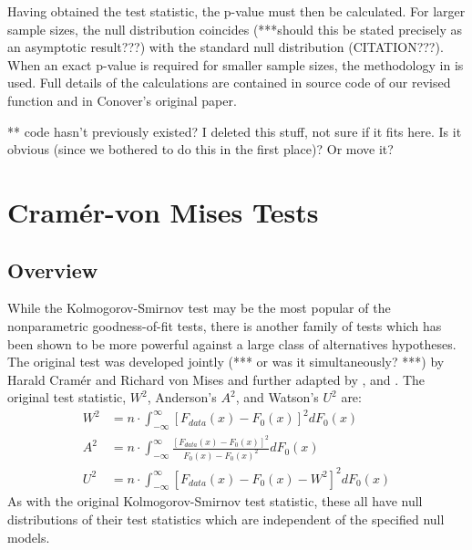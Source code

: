 Having obtained the test statistic, the p-value must then be calculated. 
For larger sample sizes, the null distribution coincides 
(***should this be
stated precisely as an asymptotic result???)
with the standard null distribution (CITATION???). 
When an exact p-value is required for
smaller sample sizes, the methodology in \citet{Conover1972} is used. 
Full details of the calculations are contained in source code
of our revised function  and in Conover's original paper. 

** code hasn't previously existed?  I deleted this stuff, not sure if
it fits here.  Is it obvious (since we bothered to do this in the first
place)?  Or move it?



\section{Cram\'{e}r-von Mises Tests}

\subsection{Overview}


While the Kolmogorov-Smirnov test may be the most popular of
the nonparametric goodness-of-fit tests, there is another family of 
tests which has been shown to be more powerful against a large class
of alternatives hypotheses. 
The original test was developed jointly (*** or was it simultaneously? ***) by
Harald Cram\'{e}r and Richard von Mises \citep{cramer1928, vonmises1928} and further adapted by \cite{anderson1952}, and  \cite{Watson1961}. 
The original test statistic, $W^2$, Anderson's $A^2$, and Watson's
$U^2$ are:
\begin{align}
W^2 &= n \cdot \int_{-\infty}^{\infty} \left[ F_{data}(x)- F_{0}(x) \right]^2 dF_0(x) \\
A^2 &= n \cdot \int_{-\infty}^{\infty} \frac{\left[F_{data}(x)- F_{0}(x) \right]^2}{F_0(x) -F_0(x)^2} dF_0(x) \\
U^2 &= n \cdot \int_{-\infty}^{\infty} \left[ F_{data}(x)- F_{0}(x) - W^2 \right]^2 dF_0(x)
\end{align}
As with the original Kolmogorov-Smirnov test statistic, these all have 
null distributions of their test statistics which are independent of the
specified null models.

